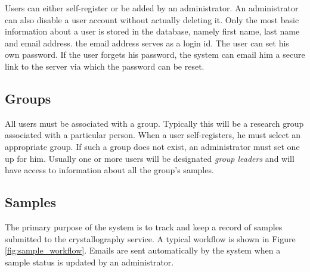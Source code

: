 \documentclass[12pt]{article}
\begin{document}
Users can either self-register or be added by an administrator.
An administrator can also disable a user account without actually
deleting it.
Only the most basic information about a user is stored in the database,
namely first name, last name and email address. the email address serves
as a login id. The user can set his own password. If the user forgets his
password, the system can email him a secure link to the server via which
the password can be reset.

\subsection{Groups}

All users must be associated with a group. Typically this will be a
research group associated with a particular person. When a user self-registers,
he must select an appropriate group. If such a group does not exist, an
administrator must set one up for him. Usually one or more users will be
designated \emph{group leaders} and will have access to information
about all the group's samples.

\subsection{Samples}

The primary purpose of the system is to track and keep a record of
samples submitted to the crystallography service. A typical workflow is
shown in Figure \ref{fig:sample_workflow}.
Emails are sent automatically by the system when a sample status
is updated by an administrator.
\end{document}
